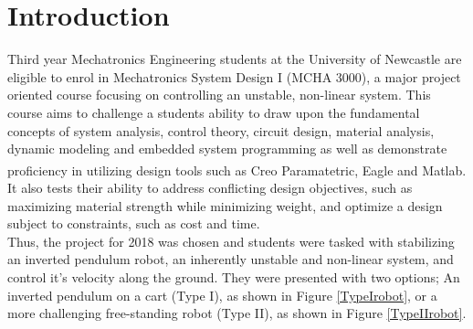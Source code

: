 \documentclass{UoNMCHA}
\numberwithin{equation}{section}
\begin{document}
\section{Introduction}
%   
Third year Mechatronics Engineering students at the University of Newcastle are eligible to enrol in Mechatronics System Design I (MCHA 3000), a  major project oriented course focusing on controlling an unstable, non-linear system. This course aims to challenge a students ability to draw upon the fundamental concepts of system analysis, control theory, circuit design, material analysis, dynamic modeling and embedded system programming as well as demonstrate proficiency in utilizing design tools such as Creo Paramatetric\textsuperscript{\texttrademark}, Eagle\textsuperscript{\texttrademark} and Matlab\textsuperscript{\texttrademark}. It also tests their ability to address conflicting design objectives, such as maximizing material strength while minimizing weight, and optimize a design subject to constraints, such as cost and time.\\ 

Thus, the project for 2018 was chosen and students were tasked with stabilizing an inverted pendulum robot, an inherently unstable and non-linear system, and control it's velocity along the ground. They were presented with two options; An inverted pendulum on a cart (Type I), as shown in Figure \ref{TypeIrobot}, or a more challenging free-standing robot (Type II), as shown in Figure \ref{TypeIIrobot}.
\end{document}
